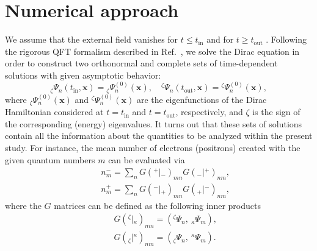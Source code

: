 \documentclass[preprint,aps,prd,showpacs,floatfix]{revtex4-1}
\begin{document}
\section{Numerical approach}\label{sec:appendix}
%
We assume that the external field vanishes for $t \leq t_\text{in}$ and for $t \geq t_\text{out}$ \big[e.g., for the Ia envelope defined by Eq.~(\ref{eq:F_Ia}), we choose $t_\text{in} = - t_\text{out} = -T/2 - \Delta T$\big]. Following the rigorous QFT formalism described in Ref.~\cite{fradkin_gitman_shvartsman}, we solve the Dirac equation in order to construct two orthonormal and complete sets of time-dependent solutions with given asymptotic behavior:
%
\begin{equation}
{}_\zeta \Psi_n (t_\text{in}, \boldsymbol{x}) = {}_\zeta \Psi^{(0)}_n (\boldsymbol{x}),\quad {}^\zeta \Psi_n (t_\text{out}, \boldsymbol{x}) = {}^\zeta \Psi^{(0)}_n (\boldsymbol{x}),\label{eq:psi_in_out}
\end{equation}
%
where ${}_\zeta \Psi^{(0)}_n (\boldsymbol{x})$ and ${}^\zeta \Psi^{(0)}_n (\boldsymbol{x})$ are the eigenfunctions of the Dirac Hamiltonian considered at $t=t_\text{in}$ and $t=t_\text{out}$, respectively, and $\zeta$ is the sign of the corresponding (energy) eigenvalues. It turns out that these sets of solutions contain all the information about the quantities to be analyzed within the present study. For instance, the mean number of electrons (positrons) created with the given quantum numbers $m$ can be evaluated via~\cite{fradkin_gitman_shvartsman}
%
\begin{eqnarray}
&&n^-_m = \sum_n G({}^+|{}_-)_{mn} G({}_-|{}^+)_{nm}, \label{eq:num_el}\\
&&n^+_m = \sum_n G({}^-|{}_+)_{mn} G({}_+|{}^-)_{nm}, \label{eq:num_pos}
\end{eqnarray}
%
where the $G$ matrices can be defined as the following inner products
%
\begin{eqnarray}
&&G({}^\zeta|{}_\kappa)_{nm} = ({}^\zeta \Psi_n,~{}_\kappa \Psi_m), \label{eq:G_inner_product_1}\\
&&G({}_\zeta|{}^\kappa)_{nm} = ({}_\zeta \Psi_n,~{}^\kappa \Psi_m). \label{eq:G_inner_product_2}
\end{eqnarray}
%
\end{document}
